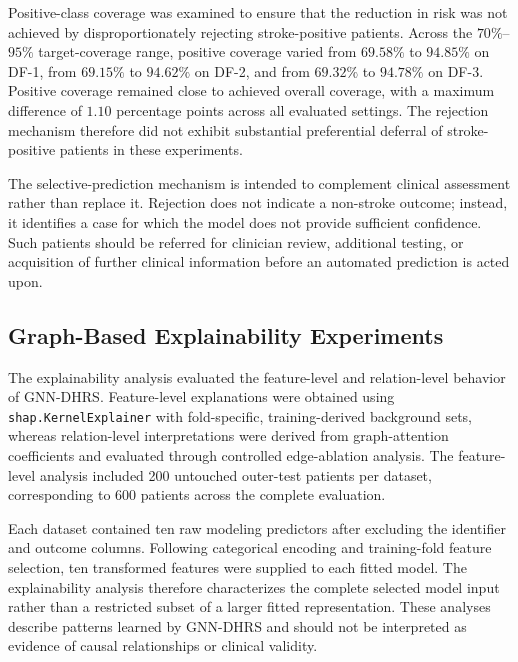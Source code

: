 \documentclass[pdflatex,sn-mathphys-num]{sn-jnl}%
\theoremstyle{thmstyleone}%
\theoremstyle{thmstyletwo}%
\theoremstyle{thmstylethree}%
\begin{document}
 {
Positive-class coverage was examined to ensure that the reduction in risk was
not achieved by disproportionately rejecting stroke-positive patients. Across
the \(70\%\)--\(95\%\) target-coverage range, positive coverage varied from
\(69.58\%\) to \(94.85\%\) on DF-1, from \(69.15\%\) to \(94.62\%\) on DF-2,
and from \(69.32\%\) to \(94.78\%\) on DF-3. Positive coverage remained close
to achieved overall coverage, with a maximum difference of \(1.10\)
percentage points across all evaluated settings. The rejection mechanism
therefore did not exhibit substantial preferential deferral of stroke-positive
patients in these experiments.
}

 {
The selective-prediction mechanism is intended to complement clinical
assessment rather than replace it. Rejection does not indicate a non-stroke
outcome; instead, it identifies a case for which the model does not provide
sufficient confidence. Such patients should be referred for clinician review,
additional testing, or acquisition of further clinical information before an
automated prediction is acted upon.
}

\subsection{Graph-Based Explainability Experiments}
\label{subsec:explainability_results}

The explainability analysis evaluated the feature-level and relation-level
behavior of GNN-DHRS. Feature-level explanations were obtained using
\texttt{shap.KernelExplainer} with fold-specific, training-derived background
sets, whereas relation-level interpretations were derived from graph-attention
coefficients and evaluated through controlled edge-ablation analysis. The
feature-level analysis included 200 untouched outer-test patients per dataset,
corresponding to 600 patients across the complete evaluation.

 {
Each dataset contained ten raw modeling predictors after excluding the
identifier and outcome columns. Following categorical encoding and
training-fold feature selection, ten transformed features were supplied to
each fitted model. The explainability analysis therefore characterizes the
complete selected model input rather than a restricted subset of a larger
fitted representation. These analyses describe patterns learned by GNN-DHRS
and should not be interpreted as evidence of causal relationships or clinical
validity.
}
\end{document}
